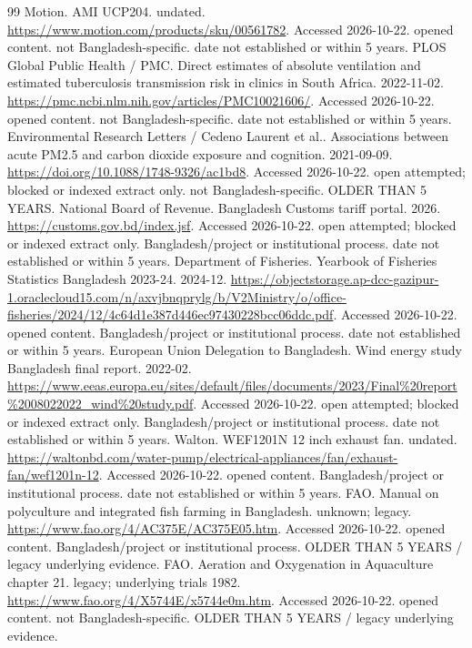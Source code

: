 \documentclass[11pt,a4paper]{article}
\begin{document}
\begin{thebibliography}{99}
 Motion. AMI UCP204. undated. \url{https://www.motion.com/products/sku/00561782}. Accessed 2026-10-22. opened content. not Bangladesh-specific. date not established or within 5 years.
 PLOS Global Public Health / PMC. Direct estimates of absolute ventilation and estimated tuberculosis transmission risk in clinics in South Africa. 2022-11-02. \url{https://pmc.ncbi.nlm.nih.gov/articles/PMC10021606/}. Accessed 2026-10-22. opened content. not Bangladesh-specific. date not established or within 5 years.
 Environmental Research Letters / Cedeno Laurent et al.. Associations between acute PM2.5 and carbon dioxide exposure and cognition. 2021-09-09. \url{https://doi.org/10.1088/1748-9326/ac1bd8}. Accessed 2026-10-22. open attempted; blocked or indexed extract only. not Bangladesh-specific. OLDER THAN 5 YEARS.
 National Board of Revenue. Bangladesh Customs tariff portal. 2026. \url{https://customs.gov.bd/index.jsf}. Accessed 2026-10-22. open attempted; blocked or indexed extract only. Bangladesh/project or institutional process. date not established or within 5 years.
 Department of Fisheries. Yearbook of Fisheries Statistics Bangladesh 2023-24. 2024-12. \url{https://objectstorage.ap-dcc-gazipur-1.oraclecloud15.com/n/axvjbnqprylg/b/V2Ministry/o/office-fisheries/2024/12/4c64d1e387d446ec97430228bcc06ddc.pdf}. Accessed 2026-10-22. opened content. Bangladesh/project or institutional process. date not established or within 5 years.
 European Union Delegation to Bangladesh. Wind energy study Bangladesh final report. 2022-02. \url{https://www.eeas.europa.eu/sites/default/files/documents/2023/Final%20report%2008022022_wind%20study.pdf}. Accessed 2026-10-22. open attempted; blocked or indexed extract only. Bangladesh/project or institutional process. date not established or within 5 years.
 Walton. WEF1201N 12 inch exhaust fan. undated. \url{https://waltonbd.com/water-pump/electrical-appliances/fan/exhaust-fan/wef1201n-12}. Accessed 2026-10-22. opened content. Bangladesh/project or institutional process. date not established or within 5 years.
 FAO. Manual on polyculture and integrated fish farming in Bangladesh. unknown; legacy. \url{https://www.fao.org/4/AC375E/AC375E05.htm}. Accessed 2026-10-22. opened content. Bangladesh/project or institutional process. OLDER THAN 5 YEARS / legacy underlying evidence.
 FAO. Aeration and Oxygenation in Aquaculture chapter 21. legacy; underlying trials 1982. \url{https://www.fao.org/4/X5744E/x5744e0m.htm}. Accessed 2026-10-22. opened content. not Bangladesh-specific. OLDER THAN 5 YEARS / legacy underlying evidence.

\end{thebibliography}
\end{document}
